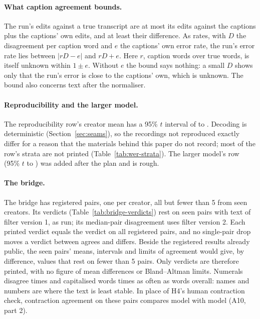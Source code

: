 \paragraph{What caption agreement bounds.} The run's edits against a true transcript are at most its edits against the
captions plus the captions' own edits, and at least their difference. As rates, with $D$ the disagreement per caption
word and $e$ the captions' own error rate, the run's error rate lies between $|rD - e|$ and $rD + e$. Here $r$, caption
words over true words, is itself unknown within $1 \pm e$. Without $e$ the bound says nothing: a small $D$ shows only
that the run's error is close to the captions' own, which is unknown. The bound also concerns text after the
normaliser.

\paragraph{Reproducibility and the larger model.} The reproducibility row's creator mean has a 95\% $t$ interval of
\AnchorReproMeanTLo{} to \AnchorReproMeanTHi. Decoding is deterministic (Section~\ref{sec:seams}), so the recordings
not reproduced exactly differ for a reason that the materials behind this paper do not record; most of the row's strata
are not printed (Table~\ref{tab:wer-strata}). The larger model's row (95\% $t$ \AnchorLargerModelTLo{} to
\AnchorLargerModelTHi) was added after the plan and is rough.

\paragraph{The bridge.} The bridge has \BridgePairs{} registered pairs, one per creator, all but fewer than 5 from seen
creators. Its verdicts (Table~\ref{tab:bridge-verdicts}) rest on \BridgeSeenPairs{} seen pairs with text of filter
version 1, as run; its median-pair disagreement uses filter version 2. Each printed verdict equals the verdict on all
registered pairs, and no single-pair drop moves a verdict between agrees and differs. Beside the registered results
already public, the seen pairs' means, intervals and limits of agreement would give, by difference, values that rest on
fewer than 5 pairs. Only verdicts are therefore printed, with no figure of mean differences or Bland--Altman limits. Numerals disagree
\BridgeNumeralRatio{} times and capitalised words \BridgeCapsRatio{} times as often as words overall: names and numbers
are where the text is least stable. In place of H4's human contraction check, contraction agreement on these pairs
compares model with model (A10, part 2).

